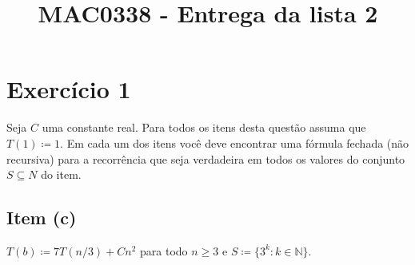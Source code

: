 \documentclass{article}
\author{}
\title{MAC0338 - Entrega da lista 2}
\date{}
\begin{document}
\maketitle

\section*{Exercício 1}
Seja $C$ uma constante real. Para todos os itens desta questão assuma que $T(1) \coloneqq 1$. Em cada um dos itens você deve encontrar uma fórmula fechada (não recursiva) para a recorrência que seja verdadeira em todos os valores do conjunto $S \subseteq N$ do item.

\subsection*{Item (c)}
$T(b) \coloneqq 7 T(n/3) + Cn^2$ para todo $n \geq 3$ e $S \coloneqq \{ 3^k : k \in \mathbb{N} \}$.
\end{document}
